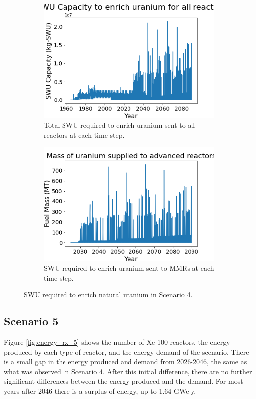 \begin{figure}
    \centering
    \begin{subfigure}{0.4\textwidth}
        \centering
        \includegraphics[scale=0.3]{figures/totalswu_scenarios_4.png}
        \caption{Total \gls{SWU} required to enrich uranium sent to all reactors at each time step.}
        \label{fig:totalswu_4}
    \end{subfigure}
    \begin{subfigure}{0.4\textwidth}
        \centering
        \includegraphics[scale=0.3]{figures/advancedRX_fuelsupply_scenarios_4.png}
        \caption{\gls{SWU} required to enrich uranium sent to \glspl{MMR} at each time step.}
        \label{fig:haleuswu_4}
    \end{subfigure}
    \caption{\gls{SWU} required to enrich natural uranium in Scenario 4.}
    \label{fig:swu_4}
\end{figure}


\subsection{Scenario 5}
Figure \ref{fig:energy_rx_5} shows the number of Xe-100 reactors, the 
energy produced by each type of reactor, and the energy demand of the 
scenario. There is a small gap in the energy produced and demand from 
2026-2046, the same as what was observed in Scenario 4. After this 
initial difference, there are no further significant differences between 
the energy produced and the demand. For most years after 2046 there 
is a surplus of energy, up to 1.64 GWe-y. 

